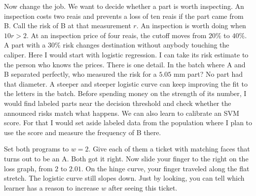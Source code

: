Now change the job. We want to decide whether a part is worth inspecting. An inspection costs two reais and prevents a loss of ten reais if the part came from B. Call the risk of B at that measurement $r$. An inspection is worth doing when $10r>2$. At an inspection price of four reais, the cutoff moves from $20\%$ to $40\%$. A part with a $30\%$ risk changes destination without anybody touching the caliper. Here I would start with logistic regression. I can take its risk estimate to the person who knows the prices. There is one detail. In the batch where A and B separated perfectly, who measured the risk for a $5.05$ mm part? No part had that diameter. A steeper and steeper logistic curve can keep improving the fit to the letters in the batch. Before spending money on the strength of its number, I would find labeled parts near the decision threshold and check whether the announced risks match what happens. We can also learn to calibrate an SVM score. For that I would set aside labeled data from the population where I plan to use the score and measure the frequency of B there.

Set both programs to $w=2$. Give each of them a ticket with matching faces that turns out to be an A. Both got it right. Now slide your finger to the right on the loss graph, from $2$ to $2.01$. On the hinge curve, your finger traveled along the flat stretch. The logistic curve still slopes down. Just by looking, you can tell which learner has a reason to increase $w$ after seeing this ticket.

